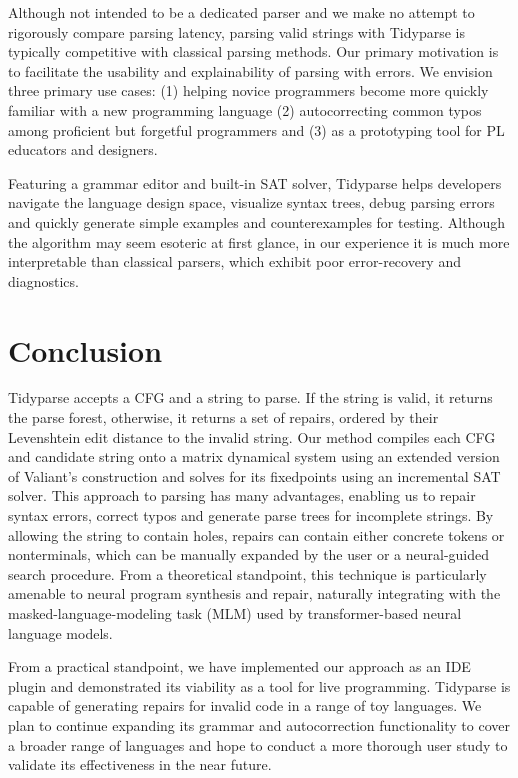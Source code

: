 \documentclass[sigplan,review,anonymous,acmsmall]{acmart}\settopmatter{printfolios=false,printccs=false,printacmref=false}
\begin{document}
    Although not intended to be a dedicated parser and we make no attempt to rigorously compare parsing latency, parsing valid strings with Tidyparse is typically competitive with classical parsing methods. Our primary motivation is to facilitate the usability and explainability of parsing with errors. We envision three primary use cases: (1) helping novice programmers become more quickly familiar with a new programming language (2) autocorrecting common typos among proficient but forgetful programmers and (3) as a prototyping tool for PL educators and designers.

    Featuring a grammar editor and built-in SAT solver, Tidyparse helps developers navigate the language design space, visualize syntax trees, debug parsing errors and quickly generate simple examples and counterexamples for testing. Although the algorithm may seem esoteric at first glance, in our experience it is much more interpretable than classical parsers, which exhibit poor error-recovery and diagnostics.

    \section{Conclusion}

    Tidyparse accepts a CFG and a string to parse. If the string is valid, it returns the parse forest, otherwise, it returns a set of repairs, ordered by their Levenshtein edit distance to the invalid string. Our method compiles each CFG and candidate string onto a matrix dynamical system using an extended version of Valiant's construction and solves for its fixedpoints using an incremental SAT solver. This approach to parsing has many advantages, enabling us to repair syntax errors, correct typos and generate parse trees for incomplete strings. By allowing the string to contain holes, repairs can contain either concrete tokens or nonterminals, which can be manually expanded by the user or a neural-guided search procedure. From a theoretical standpoint, this technique is particularly amenable to neural program synthesis and repair, naturally integrating with the masked-language-modeling task (MLM) used by transformer-based neural language models.

    From a practical standpoint, we have implemented our approach as an IDE plugin and demonstrated its viability as a tool for live programming. Tidyparse is capable of generating repairs for invalid code in a range of toy languages. We plan to continue expanding its grammar and autocorrection functionality to cover a broader range of languages and hope to conduct a more thorough user study to validate its effectiveness in the near future. %
\end{document}
